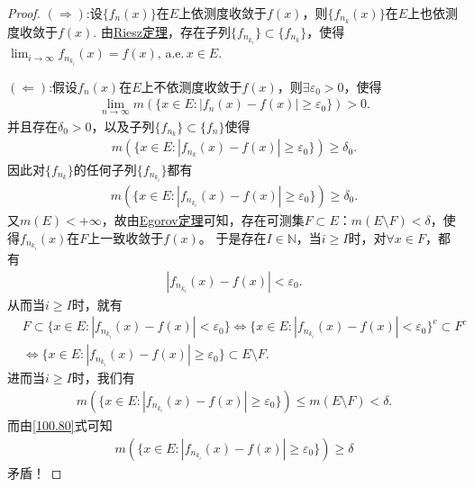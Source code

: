 \documentclass[../../main.tex]{subfiles}%
\begin{document}
\begin{proof}

\((\Rightarrow)\):设$\{f_n(x)\}$在$E$上依测度收敛于$f(x)$，则$\{f_{n_k}(x)\}$在$E$上也依测度收敛于$f(x)$. 由\hyperref[theorem:Riesz定理]{Riesz定理}，存在子列\(\{f_{n_{k_i}}\} \subset \{f_{n_k}\}\)，使得$\lim_{i\to \infty}f_{n_{k_i}}(x)= f(x),\,\text{a.e.}\,x\in E.$

\((\Leftarrow)\):假设\(f_n(x)\)在\(E\)上不依测度收敛于\(f(x)\)，则\(\exists \varepsilon_0 > 0\)，使得
\begin{align*}
\underset{n\rightarrow \infty}{\lim}m(\{x\in E:|f_n(x)-f(x)|\geqslant \varepsilon _0\})>0.
\end{align*}
并且存在\(\delta_0 > 0\)，以及子列\(\{f_{n_k}\} \subset \{f_n\}\)使得
\begin{align*}
m(\{x \in E : |f_{n_k}(x) - f(x)| \geqslant \varepsilon_0\}) \geqslant \delta_0.
\end{align*}
因此对\(\{f_{n_k}\}\)的任何子列$\{f_{n_{k_i}}\}$都有
\begin{align}
m(\{x \in E : |f_{n_{k_i}}(x) - f(x)| \geqslant \varepsilon_0\}) \geqslant \delta_0.\label{100.80}
\end{align}
又\(m(E) < +\infty\)，故由\hyperref[theorem:Egorov定理]{Egorov定理}可知，存在可测集\(F \subset E\)：\(m(E \setminus F) < \delta\)，使得\(f_{n_{k_i}}(x)\)在\(F\)上一致收敛于\(f(x)\)。
于是存在\(I \in \mathbb{N}\)，当\(i \geqslant I\)时，对\(\forall x \in F\)，都有
\begin{align*}
|f_{n_{k_i}}(x) - f(x)| < \varepsilon_0.
\end{align*}
从而当\(i \geqslant I\)时，就有
\begin{align*}
&F \subset \{x \in E : |f_{n_{k_i}}(x) - f(x)| < \varepsilon_0\} \Longleftrightarrow \{x \in E : |f_{n_{k_i}}(x) - f(x)| < \varepsilon_0\}^c \subset F^c \\
&\Longleftrightarrow \{x \in E : |f_{n_{k_i}}(x) - f(x)| \geqslant \varepsilon_0\} \subset E \setminus F.
\end{align*}
进而当\(i \geqslant I\)时，我们有
\begin{align*}
m(\{x \in E : |f_{n_{k_i}}(x) - f(x)| \geqslant \varepsilon_0\}) \leqslant m(E \setminus F) < \delta.
\end{align*}
而由\eqref{100.80}式可知
\begin{align*}
m(\{x \in E : |f_{n_{k_i}}(x) - f(x)| \geqslant \varepsilon_0\}) \geqslant \delta
\end{align*}
矛盾！
\end{proof}
\end{document}
